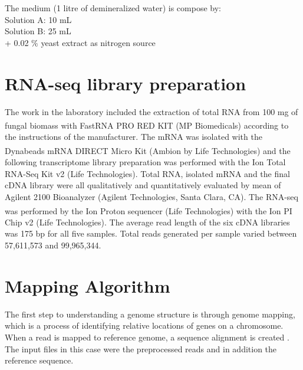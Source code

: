 \documentclass[12pt, a4paper]{report}
\begin{document}
The medium (1 litre of demineralized water) is compose by: \\
Solution A: 10 mL \\
Solution B: 25 mL \\
+ 0.02 $\%$ yeast extract as nitrogen source

\section{RNA-seq library preparation}
The work in the laboratory included the extraction of total RNA from 100 mg of fungal biomass with FastRNA PRO\textsuperscript{\texttrademark} RED KIT (MP Biomedicals) according to the instructions of the manufacturer. The mRNA was isolated with the Dynabeads\textsuperscript{\textregistered} mRNA DIRECT\textsuperscript{\texttrademark} Micro Kit (Ambion by Life Technologies) and the following transcriptome library preparation was performed with the Ion Total RNA-Seq Kit v2 (Life Technologies). 
Total RNA, isolated mRNA and the final cDNA library were all qualitatively and quantitatively evaluated by mean of Agilent 2100 Bioanalyzer (Agilent Technologies, Santa Clara, CA). The RNA-seq was performed by the Ion Proton\textsuperscript{\texttrademark} sequencer (Life Technologies) with the Ion PI Chip v2 (Life Technologies). 
The average read length of the six cDNA libraries was 175 bp for all five samples. Total reads generated per sample varied between 57,611,573 and 99,965,344. 

\section{Mapping Algorithm}\label{STAR}
The first step to understanding a genome structure is through genome mapping, which is a process of identifying relative locations of genes on a chromosome. When a read is mapped to reference genome, a sequence alignment is created \cite{Xiong2006}. The input files in this case were the preprocessed reads and in addition the reference sequence. \\
\end{document}
